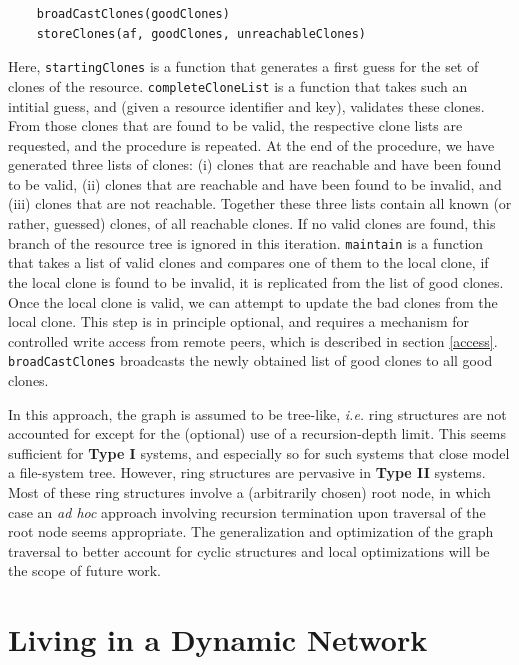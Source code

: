 \documentclass[11pt]{article}
\begin{document}
\begin{mainmatter}
\begin{verbatim}
    broadCastClones(goodClones)
    storeClones(af, goodClones, unreachableClones)
\end{verbatim}
Here, \texttt{startingClones} is a function that generates a first guess for the set of clones of the resource. \texttt{completeCloneList} is a function that takes such an intitial guess, and (given a resource identifier and key), validates these clones. From those clones that are found to be valid, the respective clone lists are requested, and the procedure is repeated. At the end of the procedure, we have generated three lists of clones: (i) clones that are reachable and have been found to be valid, (ii) clones that are reachable and have been found to be invalid, and (iii) clones that are not reachable. Together these three lists contain all known (or rather, guessed) clones, of all reachable clones. If no valid clones are found, this branch of the resource tree is ignored in this iteration. \texttt{maintain} is a function that takes a list of valid clones and compares one of them to the local clone, if the local clone is found to be invalid, it is replicated from the list of good clones. Once the local clone is valid, we can attempt to update the bad clones from the local clone. This step is in principle optional, and requires a mechanism for controlled write access from remote peers, which is described in section \ref{access}. \texttt{broadCastClones} broadcasts the newly obtained list of good clones to all good clones.

In this approach, the graph is assumed to be tree-like, \emph{i.e.} ring structures are not accounted for except for the (optional) use of a recursion-depth limit. This seems sufficient for \textbf{Type I} systems, and especially so for such systems that close model a file-system tree. However, ring structures are pervasive in \textbf{Type II} systems. Most of these ring structures involve a (arbitrarily chosen) root node, in which case an \emph{ad hoc} approach involving recursion termination upon traversal of the root node seems appropriate. The generalization and optimization of the graph traversal to better account for cyclic structures and local optimizations will be the scope of future work.

\section{Living in a Dynamic Network}
\label{dynamic}


\end{mainmatter}
\end{document}
